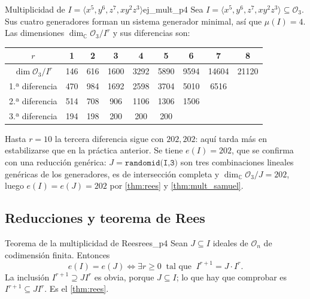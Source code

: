 \documentclass[11pt,a4paper]{article}
\begin{document}
\begin{observacion}{Multiplicidad de $I = \langle x^5, y^6, z^7, xy^2z^3 \rangle$}{ej_mult_p4}
Sea $I = \langle x^5, y^6, z^7, xy^2z^3 \rangle \subseteq \mathcal{O}_3$. Sus cuatro generadores forman un sistema generador minimal, así que $\mu(I) = 4$. Las dimensiones $\dim_{\mathbb{C}} \mathcal{O}_3/I^r$ y sus diferencias son:
\begin{center}
\setlength{\tabcolsep}{3.5pt}
\begin{tabular}{c|cccccccc}
$r$ & 1 & 2 & 3 & 4 & 5 & 6 & 7 & 8 \\ \hline
$\dim \mathcal{O}_3/I^r$ & 146 & 616 & 1600 & 3292 & 5890 & 9594 & 14604 & 21120 \\
1.ª diferencia & 470 & 984 & 1692 & 2598 & 3704 & 5010 & 6516 & \\
2.ª diferencia & 514 & 708 & 906 & 1106 & 1306 & 1506 & & \\
3.ª diferencia & 194 & 198 & 200 & 200 & 200 & & &
\end{tabular}
\end{center}
Hasta $r = 10$ la tercera diferencia sigue con $202, 202$: aquí tarda más en estabilizarse que en la práctica anterior. Se tiene $e(I) = 202$, que se confirma con una reducción genérica: $J = \texttt{randomid(I,3)}$ son tres combinaciones lineales genéricas de los generadores, es de intersección completa y $\dim_{\mathbb{C}} \mathcal{O}_3/J = 202$, luego $e(I) = e(J) = 202$ por \cref{thm:rees} y \cref{thm:mult_samuel}.
\end{observacion}

\subsection*{Reducciones y teorema de Rees}

\begin{teorema}{Teorema de la multiplicidad de Rees}{rees_p4}
Sean $J \subseteq I$ ideales de $\mathcal{O}_n$ de codimensión finita. Entonces
\[ e(I) = e(J) \iff \exists r \geq 0 \ \text{ tal que } \ I^{r+1} = J \cdot I^r. \]
La inclusión $I^{r+1} \supseteq J I^r$ es obvia, porque $J \subseteq I$; lo que hay que comprobar es $I^{r+1} \subseteq J I^r$. Es el \cref{thm:rees}.
\end{teorema}
\end{document}
